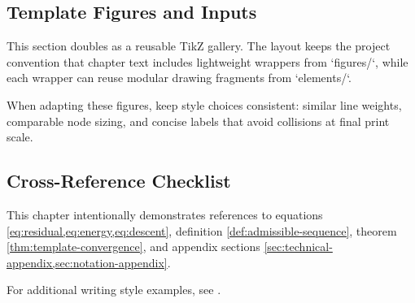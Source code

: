 \subsection{Template Figures and Inputs}
\label{ssec:template-figures}

This section doubles as a reusable TikZ gallery. The layout keeps the project convention that chapter text includes lightweight wrappers from `figures/`, while each wrapper can reuse modular drawing fragments from `elements/`.








When adapting these figures, keep style choices consistent: similar line weights, comparable node sizing, and concise labels that avoid collisions at final print scale.

\subsection{Cross-Reference Checklist}
\label{ssec:checklist}

This chapter intentionally demonstrates references to equations \cref{eq:residual,eq:energy,eq:descent}, definition \cref{def:admissible-sequence}, theorem \cref{thm:template-convergence}, and appendix sections \cref{sec:technical-appendix,sec:notation-appendix}.

For additional writing style examples, see \cite{tao2011book,knuth1984texbook}.
